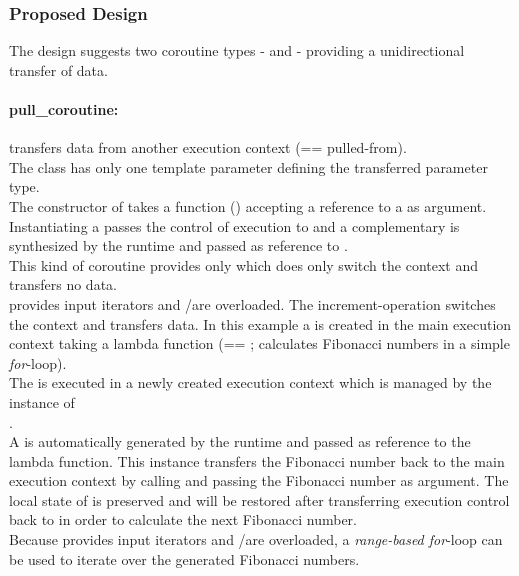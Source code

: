 
\subsubsection*{Proposed Design}
The design suggests two coroutine types - \pushcoro and \pullcoro - providing a
unidirectional transfer of data.

\paragraph*{pull\_coroutine:}
\pullcoro transfers data from another execution context (== pulled-from).\\
The class has only one template parameter defining the transferred parameter
type.\\
The constructor of \pullcoro takes a function (\corofunction) accepting a
reference to a \pushcoro as argument. Instantiating a \pullcoro passes the
control of execution to \corofunction and a complementary \pushcoro is
synthesized by the runtime and passed as reference to \corofunction.\\
\newline
This kind of coroutine provides only \pullcoroop which does only switch the
context and transfers no data.\\
\newline
\pullcoro provides input iterators and \bgin/\ed are overloaded. The
increment-operation switches the context and transfers data.
In this example a \pullcoro is created in the main execution context taking a
lambda function (== \corofunction; calculates Fibonacci numbers in a simple
\textit{for}-loop).\\
The \corofunction is executed in a newly created execution context which is
managed by the instance of\\
\pullcoro.\\
A \pushcoro is automatically generated by the runtime and passed as reference to
the lambda function. This \pushcoro instance transfers the Fibonacci number back
to the main execution context by calling \pushcoroop and passing the Fibonacci
number as argument. The local state of \corofunction is preserved and will be
restored after transferring execution control back to \corofunction in order to
calculate the next Fibonacci number.\\
Because \pullcoro provides input iterators and \bgin/\ed are overloaded, a
\textit{range-based for}-loop can be used to iterate over the generated
Fibonacci numbers.

